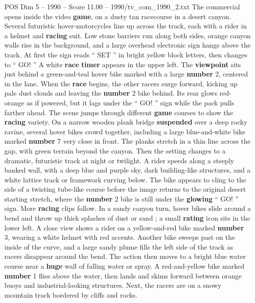 \begin{textsample}{POS Dim 5 – 1990 – Score 11.00 – 1990/tv\_com\_1990\_2.txt}  \label{ex:f5_pos_008}
The commercial opens inside the video \textbf{game}, on a dusty tan racecourse in a desert canyon.
Several futuristic hover-motorcycles line up across the track, each with a rider in a helmet and \textbf{racing} suit.
Low stone barriers run along both sides, orange canyon walls rise in the background, and a large overhead electronic sign hangs above the track.
At first the sign reads “ SET ” in bright yellow block letters, then changes to “ GO! ” A white \textbf{race} \textbf{timer} appears in the upper left.
The \textbf{viewpoint} sits just behind a green-and-teal hover bike marked with a large \textbf{number} 2, centered in the lane.
When the \textbf{race} begins, the other racers surge forward, kicking up pale dust clouds and leaving the \textbf{number} 2 bike behind.
Its rear glows red-orange as if powered, but it lags under the “ GO! ” sign while the pack pulls farther ahead.
The scene jumps through different \textbf{game} courses to show the \textbf{racing} variety.
On a narrow wooden plank bridge \textbf{suspended} over a deep rocky ravine, several hover bikes crowd together, including a large blue-and-white bike marked \textbf{number} 7 very close in front.
The planks stretch in a thin line across the gap, with green terrain beyond the canyon.
Then the setting changes to a dramatic, futuristic track at night or twilight.
A rider speeds along a steeply banked wall, with a deep blue and purple sky, dark building-like structures, and a white lattice track or framework curving below.
The bike appears to cling to the side of a twisting tube-like course before the image returns to the original desert starting stretch, where the \textbf{number} 2 bike is still under the \textbf{glowing} “ GO! ” sign.
More \textbf{racing} clips follow.
In a sandy canyon turn, hover bikes slide around a bend and throw up thick splashes of dust or sand ; a small \textbf{rating} icon sits in the lower left.
A close view shows a rider on a yellow-and-red bike marked \textbf{number} 3, wearing a white helmet with red accents.
Another bike sweeps past on the inside of the curve, and a large sandy plume fills the left side of the track as racers disappear around the bend.
The action then moves to a bright blue water course near a \textbf{huge} wall of falling water or spray.
A red-and-yellow bike marked \textbf{number} 1 flies above the water, then lands and skims forward between orange buoys and industrial-looking structures.
Next, the racers are on a snowy mountain track bordered by cliffs and rocks.

\end{textsample}
